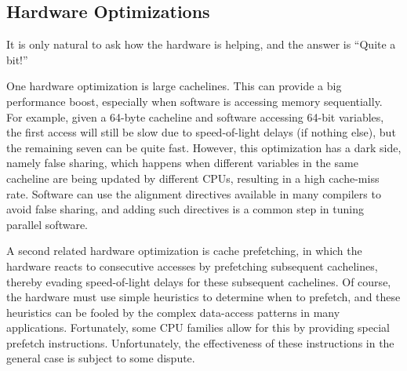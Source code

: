
\QuickQuizEnd

\subsection{Hardware Optimizations}
\label{sec:cpu:Hardware Optimizations}

It is only natural to ask how the hardware is helping, and the answer
is ``Quite a bit!''

One hardware optimization is large cachelines.
This can provide a big performance boost, especially when software is
accessing memory sequentially.
For example, given a 64-byte cacheline and software accessing 64-bit
variables, the first access will still be slow due to speed-of-light
delays (if nothing else), but the remaining seven can be quite fast.
However, this optimization has a dark side, namely false sharing,
which happens when different variables in the same cacheline are
being updated by different CPUs, resulting in a high cache-miss rate.
Software can use the alignment directives available in many compilers
to avoid false sharing, and adding such directives is a common step
in tuning parallel software.

A second related hardware optimization is cache prefetching, in which
the hardware reacts to consecutive accesses by prefetching subsequent
cachelines, thereby evading speed-of-light delays for these
subsequent cachelines.
Of course, the hardware must use simple heuristics to determine when
to prefetch, and these heuristics can be fooled by the complex data-access
patterns in many applications.
Fortunately, some CPU families allow for this by providing special
prefetch instructions.
Unfortunately, the effectiveness of these instructions in the general
case is subject to some dispute.

